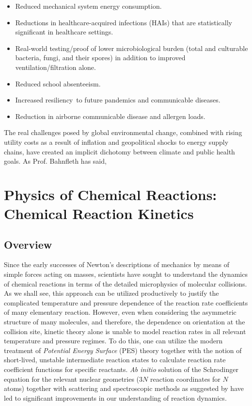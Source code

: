 \begin{itemize}
\item Reduced mechanical system energy consumption.
\item Reductions in healthcare-acquired infections (HAIs) that are statistically significant in healthcare settings.
\item Real-world testing/proof of lower microbiological burden (total and culturable bacteria, fungi, and their spores) in addition to improved ventilation/filtration alone.
\item Reduced school absenteeism.
\item Increased resiliency to future pandemics and communicable diseases.
\item Reduction in airborne communicable disease and allergen loads.
\end{itemize}


The real challenges posed by global environmental change, combined with rising utility costs as a result of inflation and geopolitical shocks to energy supply chains, have created an implicit dichotomy between climate and public health goals. As Prof. Bahnfleth has said,



\section{Physics of Chemical Reactions: Chemical Reaction Kinetics}

\subsection{Overview}

Since the early successes of Newton's descriptions of mechanics by means of simple forces acting on masses, scientists have sought to understand the dynamics of chemical reactions in terms of the detailed microphysics of molecular collisions. As we shall see, this approach can be utilized productively to justify the complicated temperature and pressure dependence of the reaction rate coefficients of many elementary reaction. However, even when considering the asymmetric structure of many molecules, and therefore, the dependence on orientation at the collision site, kinetic theory alone is unable to model reaction rates in all relevant temperature and pressure regimes. To do this, one can utilize the modern treatment of \textit{Potential Energy Surface} (PES) theory together with the notion of short-lived, unstable intermediate reaction states to calculate reaction rate coefficient functions for specific reactants. \textit{Ab initio} solution of the Schrodinger equation for the relevant nuclear geometries ($3N$ reaction coordinates for $N$ atoms) together with scattering and spectroscopic methods as suggested by \cite{transition-state-spectroscopy-bimol} have led to significant improvements in our understanding of reaction dynamics.



